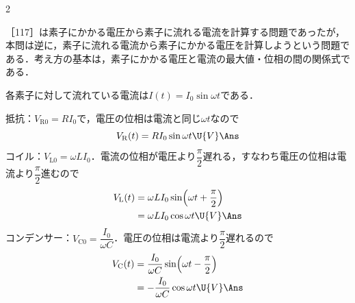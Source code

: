 \begin{multicols}{2}
\par\nopagebreak
\begin{sisin}
［117］は素子にかかる電圧から素子に流れる電流を計算する問題であったが，本問は逆に，素子に流れる電流から素子にかかる電圧を計算しようという問題である．考え方の基本は，素子にかかる電圧と電流の最大値・位相の間の関係式である．
\end{sisin}
\KaiHead
各素子に対して流れている電流は$I(t)=I_0\sin\omega t$である．
\begin{komon}
 抵抗：$V_{\mathrm{R}0}=RI_0$で，電圧の位相は電流と同じ$\omega t$なので
       \[V_{\mathrm{R}}(t)=RI_0\sin\omega t\U{V}\Ans\]
 コイル：$V_{\mathrm{L}0}=\omega LI_0$．電流の位相が電圧より$\dfrac{\pi}{2}$遅れる，すなわち電圧の位相は電流より$\dfrac{\pi}{2}$進むので
       \[\begin{aligned}V_{\mathrm{L}}(t)&=\omega LI_0\sin\Bigl(\omega t+\frac{\pi}{2}\Bigr)\\&=\omega LI_0\cos\omega t\U{V}\Ans\end{aligned}\]
 コンデンサー：$V_{\mathrm{C}0}=\dfrac{I_0}{\omega C}$．電圧の位相は電流より$\dfrac{\pi}{2}$遅れるので
       \[\begin{aligned}V_{\mathrm{C}}(t)&=\frac{I_0}{\omega C}\sin\Bigl(\omega t-\frac{\pi}{2}\Bigr)\\&=-\frac{I_0}{\omega C}\cos\omega t\U{V}\Ans\end{aligned}\]
\end{komon}

\end{multicols}
